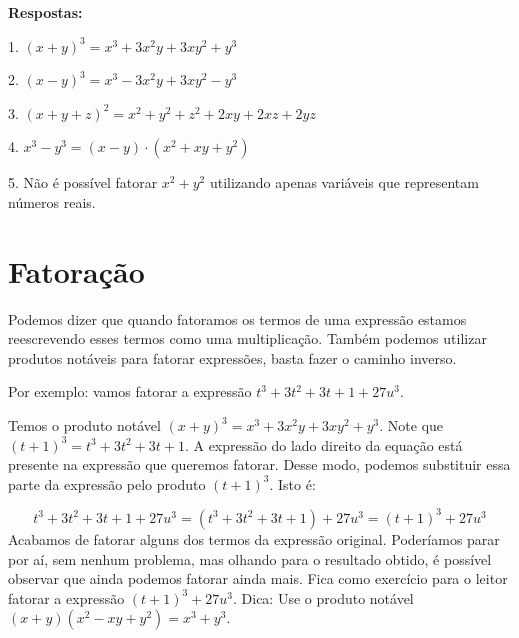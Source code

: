 \documentclass[a4paper, 12pt]{article}
\begin{document}
\noindent \textbf{Respostas:}

\begin{flushleft}
 1. \((x+y)^3 = x^3 + 3x^2y + 3xy^2 + y^3\) 
    
    2. \((x-y)^3 = x^3 - 3x^2y + 3xy^2 - y^3\)
    
     3. \((x + y + z)^2 = x^2 + y^2 + z^2 + 2xy + 2xz + 2yz\)
    
     4. \(x^3 - y^3 = (x-y)\cdot{(x^2 + xy + y^2)}\) 
    
     5. Não é possível fatorar   \(x^2 + y^2\) utilizando apenas variáveis que representam números reais.
\end{flushleft}
   




\section{Fatoração}

\noindent Podemos dizer que quando fatoramos os termos de uma expressão estamos reescrevendo esses termos como uma multiplicação. Também podemos utilizar produtos notáveis para fatorar expressões, basta fazer o caminho inverso.  

\noindent Por exemplo: vamos fatorar a expressão   \(t^3 + 3t^2 + 3t + 1 + 27u^3\). 

\noindent Temos o produto notável \((x+y)^3 = x^3 + 3x^2y + 3xy^2 + y^3\). %
Note que \((t+1)^3 = t^3 + 3t^2 + 3t + 1\). A expressão do lado direito da equação está presente na expressão que queremos fatorar. Desse modo, podemos substituir essa parte da expressão pelo produto \((t+1)^3\). Isto é:  

\noindent  \[t^3 + 3t^2 + 3t + 1 + 27u^3 = (t^3 + 3t^2 + 3t + 1) + 27u^3 = (t+1)^3 + 27u^3\] 
\noindent Acabamos de fatorar alguns dos termos da expressão original. Poderíamos parar por aí, sem nenhum problema, mas olhando para o resultado obtido, é possível observar que ainda podemos fatorar ainda mais. Fica como exercício para o leitor fatorar a expressão   \((t+1)^3 + 27u^3\). Dica: Use o produto notável   \((x+y)(x^2 - xy + y^2) = x^3 + y^3\).   

\end{document}
